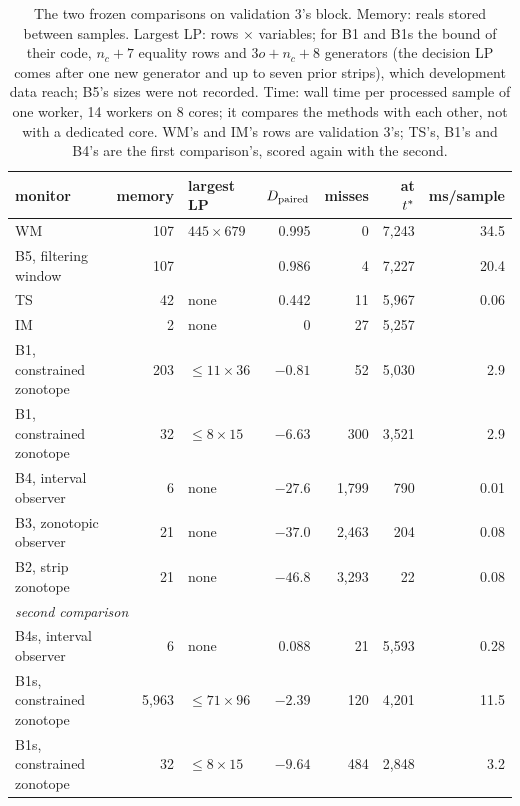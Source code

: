 \begin{table}[t]
\centering\small
\caption{The two frozen comparisons on validation 3's block. Memory: reals stored between samples. Largest LP: rows
$\times$ variables; for B1 and B1s the bound of their code, $n_c+7$ equality rows and $3o+n_c+8$ generators (the decision LP comes
after one new generator and up to seven prior strips), which development data reach; B5's sizes were not recorded. Time: wall time per processed sample of one worker, 14 workers on
8 cores; it compares the methods with each other, not with a dedicated core. WM's and IM's rows are validation 3's;
TS's, B1's and B4's are the first comparison's, scored again with the second.}
\label{tab:baselines}
\begin{tabular}{lrlrrrr}
\toprule
monitor & memory & largest LP & $D_{\mathrm{paired}}$ & misses & at $t^{\ast}$ & ms/sample\\
\midrule
WM & 107 & $445\times679$ & 0.995 & 0 & 7,243 & 34.5\\
B5, filtering window & 107 & & 0.986 & 4 & 7,227 & 20.4\\
TS & 42 & none & 0.442 & 11 & 5,967 & 0.06\\
IM & 2 & none & 0 & 27 & 5,257 & \\
B1, constrained zonotope & 203 & $\le11\times36$ & $-0.81$ & 52 & 5,030 & 2.9\\
B1, constrained zonotope & 32 & $\le8\times15$ & $-6.63$ & 300 & 3,521 & 2.9\\
B4, interval observer & 6 & none & $-27.6$ & 1,799 & 790 & 0.01\\
B3, zonotopic observer & 21 & none & $-37.0$ & 2,463 & 204 & 0.08\\
B2, strip zonotope & 21 & none & $-46.8$ & 3,293 & 22 & 0.08\\
\midrule
\multicolumn{7}{l}{\emph{second comparison}}\\
B4s, interval observer & 6 & none & 0.088 & 21 & 5,593 & 0.28\\
B1s, constrained zonotope & 5,963 & $\le71\times96$ & $-2.39$ & 120 & 4,201 & 11.5\\
B1s, constrained zonotope & 32 & $\le8\times15$ & $-9.64$ & 484 & 2,848 & 3.2\\
\bottomrule
\end{tabular}
\end{table}

